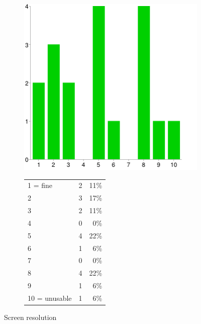 \documentclass[MSc,paper=a4,pagesize=auto]{icldt}
\begin{document}
\begin{figure}[htbp!]
\centering
\begin{subfigure}{0.4\textwidth}
    \centering
    \includegraphics[width=1\linewidth]{resources/11-screen_resolution}
\end{subfigure}%
\centering
\begin{subfigure}{0.5\textwidth}
    \centering
   	\begin{tabular}{ l c r }
1 = fine&2&11\% \\
2&3&17\% \\
3&2&11\% \\
4&0&0\% \\
5&4&22\% \\
6&1&6\% \\
7&0&0\% \\
8&4&22\% \\
9&1&6\% \\
10 = unusable&1&6\% \\
\end{tabular}
\end{subfigure} 
    \caption{Screen resolution}
    \label{fig:11-screen_resolution}
\end{figure}
\end{document}
